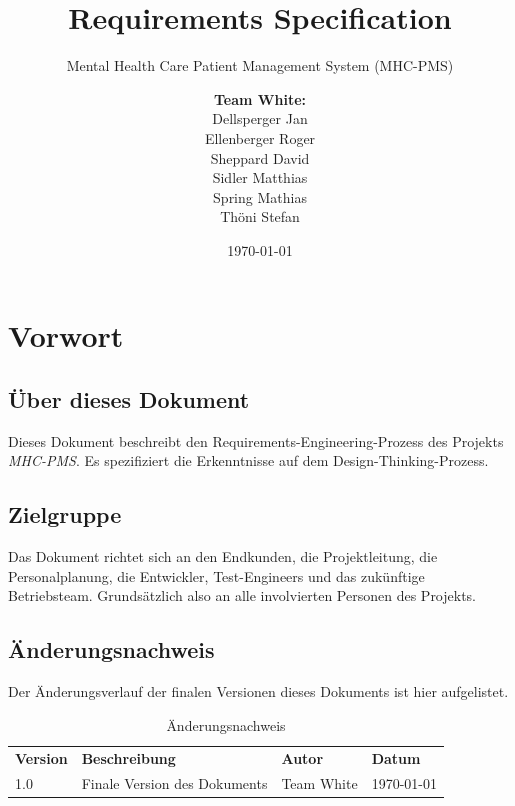 \documentclass[a4paper]{scrreprt}
\title{Requirements Specification}
\subtitle{Mental Health Care Patient Management System (MHC-PMS)}
\author{
\begin{tabular}{l}
\normalfont\bfseries{Team White:}\\
Dellsperger Jan\\
Ellenberger Roger\\
Sheppard David\\
Sidler Matthias\\
Spring Mathias\\
Thöni Stefan
\end{tabular}
}
\date{\today}
\begin{document}
\begin{titlepage}
	\maketitle
\end{titlepage}


\tableofcontents


\chapter{Vorwort}


\section{Über dieses Dokument}
Dieses Dokument beschreibt den Requirements-Engineering-Prozess des Projekts \textit{MHC-PMS}. Es spezifiziert die Erkenntnisse auf dem Design-Thinking-Prozess.


\section{Zielgruppe}
Das Dokument richtet sich an den Endkunden, die Projektleitung, die Personalplanung, die Entwickler, Test-Engineers und das zukünftige Betriebsteam. Grundsätzlich also an alle involvierten Personen des Projekts.


\section{Änderungsnachweis}
Der Änderungsverlauf der finalen Versionen dieses Dokuments ist hier aufgelistet.
\begin{table}[h]
\label{tab_version-history}
\begin{tabular}{llll}
{\textbf{Version}} & {\textbf{Beschreibung}} 							& {\textbf{Autor}} 	& {\textbf{Datum}} \\
1.0         & Finale Version des Dokuments					& Team White 		& \today  \\



\end{tabular}
\caption[Änderungsnachweis]{Änderungsnachweis}
\end{table}
\end{document}
